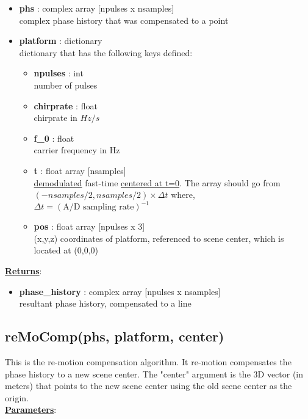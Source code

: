 \documentclass{article}
\newcommand{\defs}[2]{\textbf{{#1}} : {#2}}
\begin{document}
\begin{itemize}
	\item \defs{phs}{complex array [npulses x nsamples]}\\
  	complex phase history that was compensated to a point
  	\item \defs{platform}{dictionary}\\
  	dictionary that has the following keys defined:
	\begin{itemize}
	    \item \defs{npulses}{int}\\
	    	number of pulses
	    \item \defs{chirprate}{float}\\
	    	chirprate in $Hz/s$
	    \item \defs{f\_0}{float}\\
	    	carrier frequency in Hz
	    \item \defs{t}{float array [nsamples]}\\
	    	\underline{demodulated} fast-time \underline{centered at t=0}.  The array should go from $(-nsamples/2, nsamples/2)\times\Delta t$ where, $\Delta t = (\mbox{A/D sampling rate})^{-1}$
	    \item \defs{pos}{float array [npulses x 3]}\\
	       	(x,y,z) coordinates of platform, referenced to scene center, which is located at (0,0,0)
	\end{itemize}
\end{itemize}

\noindent \underline{\textbf{Returns}}:
\begin{itemize}
	\item \defs{phase\_history}{complex array [npulses x nsamples]}\\
	resultant phase history, compensated to a line
\end{itemize}

\subsection{reMoComp(phs, platform, center)}
This is the re-motion compensation algorithm.  It re-motion compensates the phase history to a new scene center.  The "center" argument is the 3D vector (in meters) that points to the new scene center using the old scene center as the origin.\\

\noindent \underline{\textbf{Parameters}}:
\end{document}
